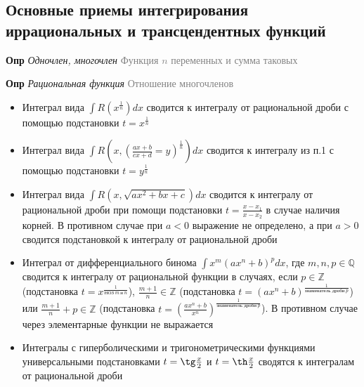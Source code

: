 \subsection{Основные приемы интегрирования иррациональных и трансцендентных функций}

\textbf{Опр} \textit{Одночлен, многочлен} \textcolor{gray}{Функция $n$ переменных и сумма таковых}

\textbf{Опр} \textit{Рациональная функция} \textcolor{gray}{Отношение многочленов}

\begin{itemize}
    \item Интеграл вида $\int R\left(x^{\frac{1}{n}}\right)dx$ сводится к интегралу от рациональной дроби с
    помощью подстановки $t = x^{\frac{1}{n}}$
    \item Интеграл вида $\int R\left(x, \left(\frac{ax+b}{cx+d} = y\right)^{\frac{1}{n}}\right)dx$ сводится к интегралу из п.1 с помощью подстановки $t = y^{\frac{1}{n}}$
    \item Интеграл вида $\int R\left(x, \sqrt{ax^2 + bx + c} \right)dx$ сводится к интегралу от рациональной дроби
    при помощи подстановки $t = \frac{x - x_1}{x - x_2}$ в случае наличия корней.
    В противном случае при $a < 0$ выражение не определено, а при $a > 0$ сводится подстановкой к интегралу от
    рациональной дроби
    \item Интеграл от дифференциального бинома $\int x^m (ax^n + b)^p dx$, где $m, n, p \in \mathbb{Q} $ сводится к
    интегралу от рациональной функции в случаях, если $p \in \mathbb{Z}$ (подстановка $t = x^{\frac{1}{\text{НОЗ}
    ~m~\text{и}~n}}$), $\frac{m+1}{n} \in \mathbb{Z}$ (подстановка $t = (ax^n + b)^{\frac{1}{\text{знаменатель
    дроби}~p}}$) или $\frac{m+1}{n} + p \in \mathbb{Z}$ (подстановка $t = \left(\frac{ax^n + b}{x^n}\right)^{\frac{1}{\text{
        знаменатель дроби}~p}}$). В противном случае через элементарные функции не выражается
    \item Интегралы с гиперболическими и тригонометрическими функциями универсальными подстановками $t = \tg \frac{x}{2}$ и $t = \th \frac{x}{2}$
    сводятся к интегралам от рациональной дроби
\end{itemize}